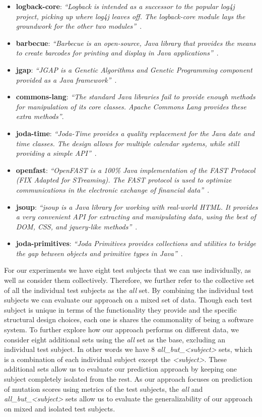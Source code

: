 \begin{itemize}
  \item \textbf{logback-core}: \emph{``Logback is intended as a successor to the popular log4j project, picking up where log4j leaves off. The logback-core module lays the groundwork for the other two modules''}~\cite{logback}.
  \item \textbf{barbecue}: \emph{``Barbecue is an open-source, Java library that provides the means to create barcodes for printing and display in Java applications''}~\cite{barbecue}.
  \item \textbf{jgap}: \emph{``JGAP is a Genetic Algorithms and Genetic Programming component provided as a Java framework''}~\cite{jgap}.
  \item \textbf{commons-lang}: \emph{``The standard Java libraries fail to provide enough methods for manipulation of its core classes. Apache Commons Lang provides these extra methods''}\cite{commons-lang}.
  \item \textbf{joda-time}: \emph{``Joda-Time provides a quality replacement for the Java date and time classes. The design allows for multiple calendar systems, while still providing a simple API''}~\cite{joda-time}.
  \item \textbf{openfast}: \emph{``OpenFAST is a 100\% Java implementation of the FAST Protocol (FIX Adapted for STreaming). The FAST protocol is used to optimize communications in the electronic exchange of financial data''}~\cite{openfast}.
  \item \textbf{jsoup}: \emph{``jsoup is a Java library for working with real-world HTML. It provides a very convenient API for extracting and manipulating data, using the best of DOM, CSS, and jquery-like methods''}~\cite{jsoup}.
  \item \textbf{joda-primitives}: \emph{``Joda Primitives provides collections and utilities to bridge the gap between objects and primitive types in Java''}~\cite{joda-primitives}.
\end{itemize}

For our experiments we have eight test subjects that we can use individually, as well as consider them collectively. Therefore, we further refer to the collective set of all the individual test subjects as the \emph{all} set. By combining the individual test subjects we can evaluate our approach on a mixed set of data. Though each test subject is unique in terms of the functionality they provide and the specific structural design choices, each one is shares the commonality of being a software system. To further explore how our approach performs on different data, we consider eight additional sets using the \emph{all} set as the base, excluding an individual test subject. In other words we have 8 \emph{all\_but\_<subject>} sets, which is a combination of each individual subject except the \emph{<subject>}. These additional sets allow us to evaluate our prediction approach by keeping one subject completely isolated from the rest. As our approach focuses on prediction of mutation scores using metrics of the test subjects, the \emph{all} and \emph{all\_but\_<subject>} sets allow us to evaluate the generalizability of our approach on mixed and isolated test subjects.


